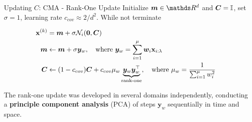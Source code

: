 \documentclass[11pt,compress,t,notes=noshow, xcolor=table]{beamer}
\begin{document}
\begin{vbframe}{Updating $C$: CMA - Rank-One Update}
Initialize $\bm{m} \in \R^d$ and $\bm{C} = \bm{\mathbb{I}}$, set $\sigma = 1$, learning rate $c_{cov} \approx 2/d^2$. While not terminate

\begin{align*}
\mathbf{x}^{(k)} &= \bm{m} + \sigma \mathcal{N}_i(\bm{0}, \bm{C}) \\
\bm{m} &\leftarrow \bm{m} + \sigma \bm{y}_w, \quad \text{where } \bm{y}_w = \sum_{i=1}^\mu \bm{w}_i\mathbf{x}_{i:\lambda} \\
\bm{C} &\leftarrow (1-c_{cov}) \bm{C} + c_{cov}\mu_w \underbrace{\bm{y}_w\bm{y}_w^\top}_{\text{rank-one}}, \quad \text{where } \mu_w = \frac{1}{\sum_{i=1}^\mu w_i^2}
\end{align*}

The rank-one update was developed in several domains independently, conducting a \textbf{principle component analysis} (PCA) of steps $\bm{y}_w$ sequentially in time and space.







\end{vbframe}
\end{document}
